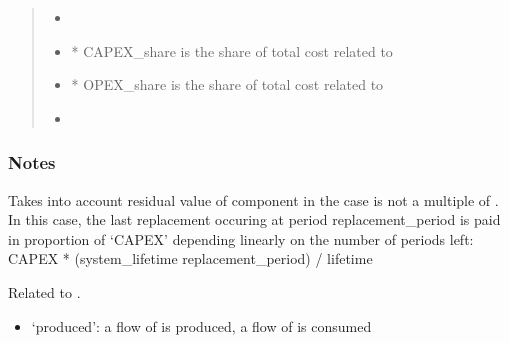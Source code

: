 \documentclass[letterpaper,10pt,english]{sphinxmanual}
\begin{document}
\begin{fulllineitems}
\begin{fulllineitems}
\begin{quote}
\begin{description}
\sphinxAtStartPar
\begin{itemize}
\item {} 
\sphinxAtStartPar
{}

\item {} 
\sphinxAtStartPar
* CAPEX\_share is the share of total cost related to 

\item {} 
\sphinxAtStartPar
* OPEX\_share is the share of total cost related to 

\item {} 
\sphinxAtStartPar
{}

\end{itemize}


\end{description}\end{quote}
\subsubsection*{Notes}

\sphinxAtStartPar
Takes into account residual value of component in the case  is not a multiple of .
In this case, the last replacement occuring at period replacement\_period is paid in proportion of ‘CAPEX’
depending linearly on the number of periods left:
CAPEX * (system\_lifetime \sphinxhyphen{} replacement\_period) / lifetime

\end{fulllineitems}


\begin{fulllineitems}
\label{\detokenize{generated/tamos.production.ElementConverter:tamos.production.ElementConverter.direction}}
\pysigstartsignatures
{}
\pysigstopsignatures
\sphinxAtStartPar
Related to .
\begin{itemize}
\item {} 
\sphinxAtStartPar
‘produced’: a flow of  is produced, a flow of  is consumed


\end{itemize}
\end{fulllineitems}
\end{fulllineitems}
\end{document}

